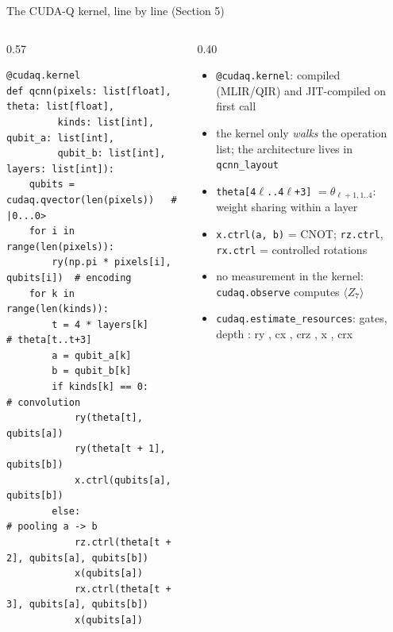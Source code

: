 \documentclass[aspectratio=169,11pt]{beamer}
\begin{document}
\begin{frame}[fragile,label=fKernel]{The CUDA-Q kernel, line by line (Section 5)}
  \begin{columns}[T]
    \begin{column}{0.57\textwidth}
\begin{lstlisting}
@cudaq.kernel
def qcnn(pixels: list[float], theta: list[float],
         kinds: list[int], qubit_a: list[int],
         qubit_b: list[int], layers: list[int]):
    qubits = cudaq.qvector(len(pixels))   # |0...0>
    for i in range(len(pixels)):
        ry(np.pi * pixels[i], qubits[i])  # encoding
    for k in range(len(kinds)):
        t = 4 * layers[k]                 # theta[t..t+3]
        a = qubit_a[k]
        b = qubit_b[k]
        if kinds[k] == 0:                 # convolution
            ry(theta[t], qubits[a])
            ry(theta[t + 1], qubits[b])
            x.ctrl(qubits[a], qubits[b])
        else:                             # pooling a -> b
            rz.ctrl(theta[t + 2], qubits[a], qubits[b])
            x(qubits[a])
            rx.ctrl(theta[t + 3], qubits[a], qubits[b])
            x(qubits[a])
\end{lstlisting}
    \end{column}
    \begin{column}{0.40\textwidth}
      \scriptsize
      \begin{itemize}\itemsep1pt
        \item \texttt{@cudaq.kernel}: compiled (MLIR/QIR) and JIT-compiled on first call
        \item the kernel only \emph{walks} the operation list; the architecture lives in \texttt{qcnn\_layout}
        \item \texttt{theta[4$\ell$..4$\ell$+3]} $= \theta_{\ell+1,1..4}$: weight sharing within a layer
        \item \texttt{x.ctrl(a, b)} = CNOT; \texttt{rz.ctrl}, \texttt{rx.ctrl} = controlled rotations
        \item no measurement in the kernel: \texttt{cudaq.observe} computes $\langle Z_7\rangle$
        \item \texttt{cudaq.estimate\_resources}: \numngates{} gates, depth \numdepth: ry \numgatesry, cx \numgatescx, crz \numgatescrz, x \numgatesx, crx \numgatescrx
      \end{itemize}
    \end{column}
  \end{columns}
\end{frame}
\end{document}
